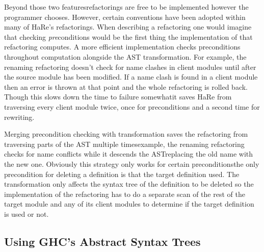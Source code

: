 Beyond those two features\DIFaddbegin \DIFadd{, }\DIFaddend refactorings are free to be implemented however the programmer chooses. However, certain conventions have been adopted within many of HaRe's refactorings. When describing a refactoring one would imagine that checking \textit{pre}conditions would be the first thing the implementation of that refactoring computes. A more efficient implementation checks preconditions throughout computation alongside the AST transformation. For example, the renaming refactoring doesn't check for name clashes in client modules until after the source module has been modified. If a name clash is found in a client module then an error is thrown at that point and the whole refactoring is rolled back. Though this slows down the time to failure somewhat\DIFaddbegin \DIFadd{, }\DIFaddend it saves HaRe from traversing every client module twice, once for preconditions and a second time for rewriting.

Merging precondition checking with transformation saves the refactoring from traversing parts of the AST multiple times\DIFdelbegin {}\DIFdelend \DIFaddbegin {}\DIFaddend example, the renaming refactoring checks for name conflicts while it descends the AST\DIFaddbegin \DIFadd{, }\DIFaddend replacing the old name with the new one. Obviously this strategy only works for certain preconditions\DIFaddbegin \DIFadd{: }\DIFaddend the only precondition for deleting a definition is that the target definition \DIFdelbegin {}\DIFdelend \DIFaddbegin {}\DIFaddend used. The transformation only affects the syntax tree of the definition to be deleted so the implementation of the refactoring has to do a separate scan of the rest of the target module and any of its client modules to determine if the target definition is used or not.

\DIFdelbegin %
\DIFdelend \DIFaddbegin \subsection{Using GHC's Abstract Syntax Trees}
\texttt{}\DIFaddend 


